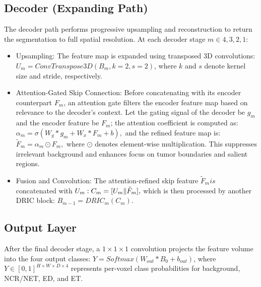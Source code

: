 \documentclass[a4paper,fleqn]{cas-dc}
\begin{document}
\subsection{Decoder (Expanding Path)}

The decoder path performs progressive upsampling and reconstruction to return the segmentation to full spatial resolution. At each decoder stage $m \in {4,3,2,1}:$

\begin{itemize}
    \item Upsampling:
The feature map is expanded using transposed 3D convolutions: $U_m = ConvTranspose3D\allowbreak(B_m, k = 2, s = 2)$, where $k$ and $s$ denote kernel size and stride, respectively.
\end{itemize}

\begin{itemize}
    \item Attention-Gated Skip Connection:
Before concatenating with its encoder counterpart $F_m$, an attention gate filters the encoder feature map based on relevance to the decoder's context.
Let the gating signal of the decoder be $g_m$ and the encoder feature be $F_m$; the attention coefficient is computed as:
$\alpha_m = \sigma(W_g * g_m + W_x * F_m+b),$ and the refined feature map is: $\tilde{F}_m=\alpha_m \odot F_m,$ where $\odot$ denotes element-wise multiplication. This suppresses irrelevant background and enhances focus on tumor boundaries and salient regions.
\end{itemize}

\begin{itemize}
    \item Fusion and Convolution:
			The attention-refined skip feature $\tilde{F}_mis$ concatenated with $U_m:
    \\C_m=[U_m \| \tilde{F}_m],$ which is then processed by another DRIC block: $B_{m-1} = DRIC_m(C_m)$.
\end{itemize}

\subsection{Output Layer}

After the final decoder stage, a $1 \times 1 \times 1$ convolution projects the feature volume into the four output classes: $Y=Softmax(W_{out} * B_0 + b_{out})$,
where $Y \in [0,1]^{H \times W \times D \times 4}$ represents per-voxel class probabilities for background, NCR/NET, ED, and ET.
\end{document}

